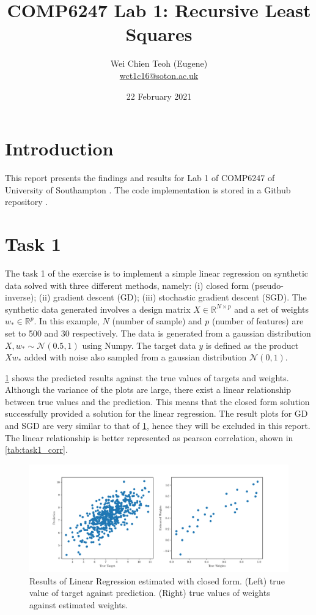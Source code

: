 \documentclass{article}
\title{COMP6247 Lab 1: Recursive Least Squares}
\author{Wei Chien Teoh (Eugene)\\\bigskip \href{mailto:wct1c16@soton.ac.uk}{wct1c16@soton.ac.uk}}
\date{22 February 2021}
\begin{document}
\maketitle

\section{Introduction}

This report presents the findings and results for Lab 1 of COMP6247 of University of Southampton \cite{lab1}. The code implementation is stored in a Github repository \cite{github}.

\section{Task 1} \label{section:task-1}

The task 1 of the exercise is to implement a simple linear regression on synthetic data solved with three different methods, namely: (i) closed form (pseudo-inverse); (ii) gradient descent (GD); (iii) stochastic gradient descent (SGD). The synthetic data generated involves a design matrix $X \in \mathbb{R}^{N \times p}$ and a set of weights $w_* \in \mathbb{R}^p$. In this example, $N$ (number of sample) and $p$ (number of features) are set to 500 and 30 respectively. The data is generated from a gaussian distribution $X, w_* \sim \mathcal{N}(0.5, 1)$ using Numpy. The target data $y$ is defined as the product $Xw_*$ added with noise also sampled from a gaussian distribution $\mathcal{N}(0, 1)$.

\cref{fig:lr_closed} shows the predicted results against the true values of targets and weights. Although the variance of the plots are large, there exist a linear relationship between true values and the prediction. This means that the closed form solution successfully provided a solution for the linear regression. The result plots for GD and SGD are very similar to that of \cref{fig:lr_closed}, hence they will be excluded in this report. The linear relationship is better represented as pearson correlation, shown in \cref{tab:task1_corr}.

\begin{figure}[h!]
    \centering
    \includegraphics[width=\textwidth]{Figures/closed.pdf}
    \caption{Results of Linear Regression estimated with closed form. (Left) true value of target against prediction. (Right) true values of weights against estimated weights.}
    \label{fig:lr_closed}
\end{figure}
\end{document}
